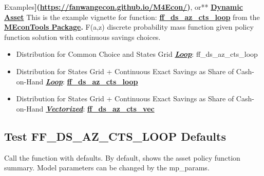 \documentclass[
]{book}
\begin{document}
Examples\textbf{{]}(\url{https://fanwangecon.github.io/M4Econ/})}, or** \href{https://fanwangecon.github.io/CodeDynaAsset/}{\textbf{Dynamic
Asset}}
This is the example vignette for function:
\href{https://github.com/FanWangEcon/MEconTools/blob/master/MEconTools/vfi/ff_ds_az_cts_loop.m}{\textbf{ff\_ds\_az\_cts\_loop}}
from the \href{https://fanwangecon.github.io/MEconTools/}{\textbf{MEconTools
Package}}\textbf{.} F(a,z)
discrete probability mass function given policy function solution with
continuous savings choices.

\begin{itemize}
\item
  Distribution for Common Choice and States Grid \underline{\textbf{\emph{Loop}}}:
  ff\_ds\_az\_cts\_loop
\item
  Distribution for States Grid + Continuous Exact Savings as Share of
  Cash-on-Hand \underline{\textbf{\emph{Loop}}}:
  \href{https://github.com/FanWangEcon/MEconTools/blob/master/MEconTools/vfi/ff_ds_az_cts_loop.m}{\textbf{ff\_ds\_az\_cts\_loop}}
\item
  Distribution for States Grid + Continuous Exact Savings as Share of
  Cash-on-Hand \underline{\textbf{\emph{Vectorized}}}:
  \href{https://github.com/FanWangEcon/MEconTools/blob/master/MEconTools/vfi/ff_ds_az_cts_vec.m}{\textbf{ff\_ds\_az\_cts\_vec}}
\end{itemize}

\hypertarget{test-ff_ds_az_cts_loop-defaults}{%
\subsection{Test FF\_DS\_AZ\_CTS\_LOOP Defaults}\label{test-ff_ds_az_cts_loop-defaults}}

Call the function with defaults. By default, shows the asset policy
function summary. Model parameters can be changed by the mp\_params.
\end{document}
